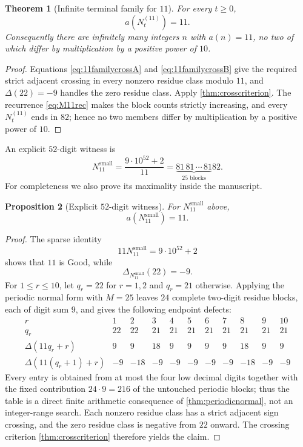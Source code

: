\documentclass[11pt]{article}
\newtheorem{theorem}{Theorem}[section]
\newtheorem{proposition}[theorem]{Proposition}
\newcommand{\Def}{\Delta}
\begin{document}
\begin{theorem}[Infinite terminal family for $11$]\label{thm:infinite11}
For every $t\ge0$,
\[
 a(N^{(11)}_t)=11.
\]
Consequently there are infinitely many integers $n$ with $a(n)=11$, no two of which differ by multiplication by a positive power of $10$.
\end{theorem}

\begin{proof}
Equations \eqref{eq:11familycrossA} and \eqref{eq:11familycrossB} give the required strict adjacent crossing in every nonzero residue class modulo $11$, and $\Def(22)=-9$ handles the zero residue class.  Apply \cref{thm:crosscriterion}.  The recurrence \eqref{eq:M11rec} makes the block counts strictly increasing, and every $N^{(11)}_t$ ends in $82$; hence no two members differ by multiplication by a positive power of $10$.
\end{proof}

An explicit $52$-digit witness is
\[
 N_{11}^{\mathrm{small}}=\frac{9\cdot10^{52}+2}{11}
 =\underbrace{81\,81\,\cdots\,81}_{25\text{ blocks}}82.
\]
For completeness we also prove its maximality inside the manuscript.

\begin{proposition}[Explicit $52$-digit witness]\label{prop:explicit11}
For $N_{11}^{\mathrm{small}}$ above,
\[
 a(N_{11}^{\mathrm{small}})=11.
\]
\end{proposition}

\begin{proof}
The sparse identity
\[
 11N_{11}^{\mathrm{small}}=9\cdot10^{52}+2
\]
shows that $11$ is Good, while
\[
 \Def_{N_{11}^{\mathrm{small}}}(22)=-9.
\]
For $1\le r\le10$, let $q_r=22$ for $r=1,2$ and $q_r=21$ otherwise.  Applying the periodic normal form with $M=25$ leaves $24$ complete two-digit residue blocks, each of digit sum $9$, and gives the following endpoint defects:
\[
\begin{array}{c|cccccccccc}
r&1&2&3&4&5&6&7&8&9&10\\ \hline
q_r&22&22&21&21&21&21&21&21&21&21\\
\Def(11q_r+r)&9&9&18&9&9&9&9&18&9&9\\
\Def(11(q_r+1)+r)&-9&-18&-9&-9&-9&-9&-9&-18&-9&-9
\end{array}
\]
Every entry is obtained from at most the four low decimal digits together with the fixed contribution $24\cdot9=216$ of the untouched periodic blocks; thus the table is a direct finite arithmetic consequence of \cref{thm:periodicnormal}, not an integer-range search.  Each nonzero residue class has a strict adjacent sign crossing, and the zero residue class is negative from $22$ onward.  The crossing criterion \cref{thm:crosscriterion} therefore yields the claim.
\end{proof}
\end{document}
